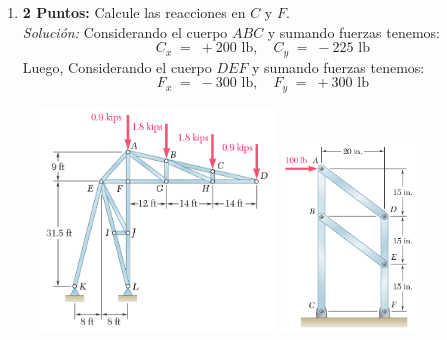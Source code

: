 \documentclass[ a4paper, twoside, 11pt]{article}
\begin{document}
\begin{problem}
\begin{enumerate}[label=\textbf{\alph*)}]
\item \textbf{2 Puntos:} Calcule las reacciones en $C$ y $F$. \\[1ex] \emph{Soluci\'on:} Considerando el cuerpo $ABC$ y sumando fuerzas tenemos: 
\[
C_x \; = \; +200 \text{ lb}, \quad
C_y \; = \; -225 \text{ lb}
\]
Luego, Considerando el cuerpo $DEF$ y sumando fuerzas tenemos: 
\[
F_x \; = \; -300 \text{ lb}, \quad
F_y \; = \; +300 \text{ lb}
\]

\end{enumerate}

\begin{figure}[htb]
\centering
\includegraphics[width=0.56\textwidth]{prob-armadura.jpg} \qquad
\includegraphics[width=0.32\textwidth]{prob-armazon.jpg}
\end{figure}

\end{problem}
\fullskip
\end{document}

